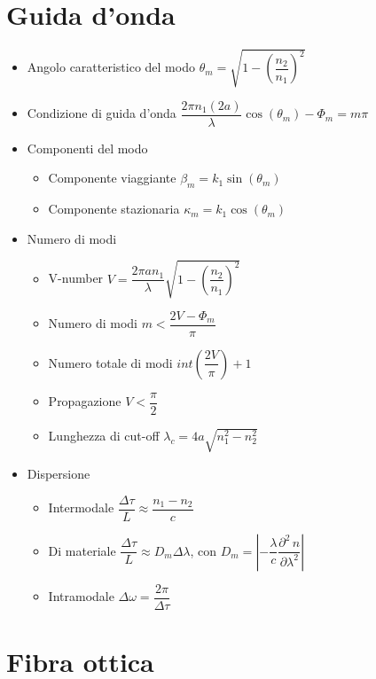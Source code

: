 \documentclass[9pt]{extarticle}
\begin{document}
\section{Guida d'onda}
\begin{itemize}
  \item Angolo caratteristico del modo \( \theta_m = \sqrt{1 - \left(\dfrac{n_2}{n_1} \right) ^ 2} \)
  \item Condizione di guida d'onda \( \dfrac{2 \pi n_1 (2 a)}{\lambda} \cos(\theta_m) - \Phi_m = m \pi \)
  \item Componenti del modo
        \begin{itemize}
          \item Componente viaggiante \( \beta_m = k_1 \sin(\theta_m)\)
          \item Componente stazionaria \( \kappa_m = k_1 \cos(\theta_m) \)
        \end{itemize}
  \item Numero di modi
        \begin{itemize}
          \item V-number \(\displaystyle V = \dfrac{2 \pi a n_1}{\lambda} \sqrt{1 - \left(\dfrac{n_2}{n_1}\right) ^ 2} \)
          \item Numero di modi \( m < \dfrac{2V - \Phi_m}{\pi} \)
          \item Numero totale di modi \( int\left(\dfrac{2V}{\pi} \right) + 1 \)
          \item Propagazione   \( V < \dfrac{\pi}{2} \)
          \item Lunghezza di cut-off \( \displaystyle \lambda_c = 4a \sqrt{n_1^2 - n_2^2} \)
        \end{itemize}
  \item Dispersione
        \begin{itemize}
          \item Intermodale \( \dfrac{\Delta \tau}{L} \approx \dfrac{n_1 - n_2}{c} \)
          \item Di materiale \( \dfrac{\Delta \tau}{L} \approx D_m \Delta \lambda \), con \( D_m = \left| -\dfrac{\lambda}{c} \dfrac{\partial ^ 2 \, n}{\partial \lambda ^ 2} \right| \)
          \item Intramodale \( \Delta \omega = \dfrac{2 \pi}{\Delta \tau} \)
        \end{itemize}
\end{itemize}

\newpage

\section{Fibra ottica}
\end{document}
